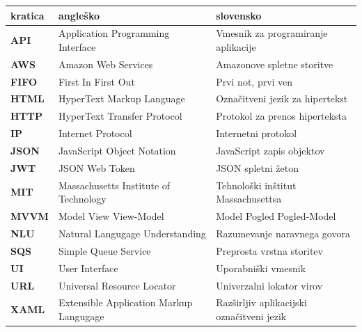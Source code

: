\documentclass[a4paper, 12pt]{book}
\newcommand{\clearemptydoublepage}{\newpage{\pagestyle{empty}\cleardoublepage}}
\begin{document}
\noindent\begin{tabular}{p{}|p{}|p{}}    %
  {\bf kratica} & {\bf angleško}                             & {\bf slovensko} \\ \hline
  {\bf API} & Application Programming Interface & Vmesnik za programiranje aplikacije \\
  {\bf AWS} & Amazon Web Services & Amazonove spletne storitve \\
  {\bf FIFO} & First In First Out & Prvi not, prvi ven \\
  {\bf HTML} & HyperText Markup Language & Označitveni jezik za hipertekst \\
  {\bf HTTP} & HyperText Transfer Protocol & Protokol za prenos hiperteksta \\
  {\bf IP} & Internet Protocol & Internetni protokol \\
  {\bf JSON} & JavaScript Object Notation & JavaScript zapis objektov\\
  {\bf JWT} & JSON Web Token & JSON spletni žeton \\
  {\bf MIT} & Massachusetts Institute of Technology & Tehnološki inštitut Massachusettsa \\
  {\bf MVVM} & Model View View-Model & Model Pogled Pogled-Model \\
  {\bf NLU} & Natural Langugage Understanding & Razumevanje naravnega govora \\
  {\bf SQS} & Simple Queue Service & Preprosta vrstna storitev \\
  {\bf UI} & User Interface & Uporabniški vmesnik \\
  {\bf URL} & Universal Resource Locator & Univerzalni lokator virov \\
  {\bf XAML} & Extensible Application Markup Langugage & Razširljiv aplikacijski označitveni jezik \\
\end{tabular}


\clearemptydoublepage
\end{document}
